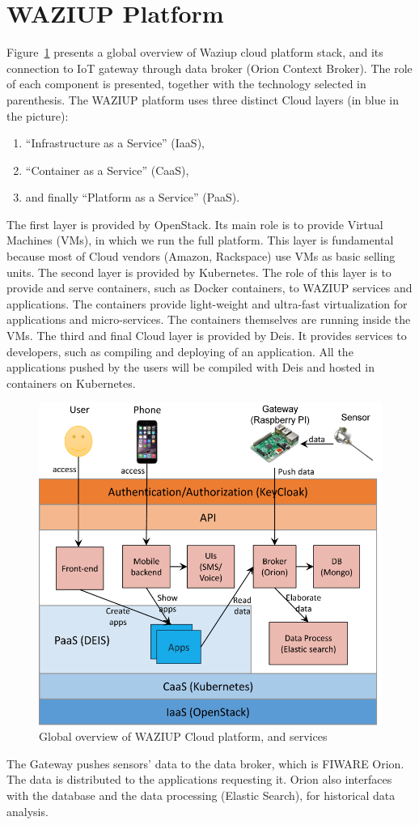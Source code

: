 \section{WAZIUP Platform}
Figure~\ref{fig-implem} presents a global overview of Waziup cloud platform stack, and its connection to IoT gateway through data broker (Orion Context Broker). The role of each component is presented, together with the technology selected in parenthesis.
The WAZIUP platform uses three distinct Cloud layers (in blue in the picture):
\begin{enumerate}
  \item “Infrastructure as a Service” (IaaS),    
  \item “Container as a Service” (CaaS),    
  \item and finally “Platform as a Service” (PaaS).     
\end{enumerate}

The first layer is provided by OpenStack. Its main role is to provide Virtual Machines (VMs), in which we run the full platform.
This layer is fundamental because most of Cloud vendors (Amazon, Rackspace) use VMs as basic selling units. The second layer is provided by Kubernetes. The role of this layer is to provide and serve containers, such as Docker containers, to WAZIUP services and applications. The containers provide light-weight and ultra-fast virtualization for applications and micro-services.
The containers themselves are running inside the VMs.
The third and final Cloud layer is provided by Deis. It provides services to developers, such as compiling and deploying of an application.
All the applications pushed by the users will be compiled with Deis and hosted in containers on Kubernetes.

\begin{figure}[htb]  
\centering  
\includegraphics[width=.6\linewidth]{figures/CloudServicesArchitecture.png}   
\caption{Global overview of WAZIUP Cloud platform, and services}
\label{fig-implem}  
\end{figure}
The Gateway pushes sensors' data to the data broker, which is FIWARE Orion.
The data is distributed to the applications requesting it.
Orion also interfaces with the database and the data processing (Elastic Search), for historical data analysis.

